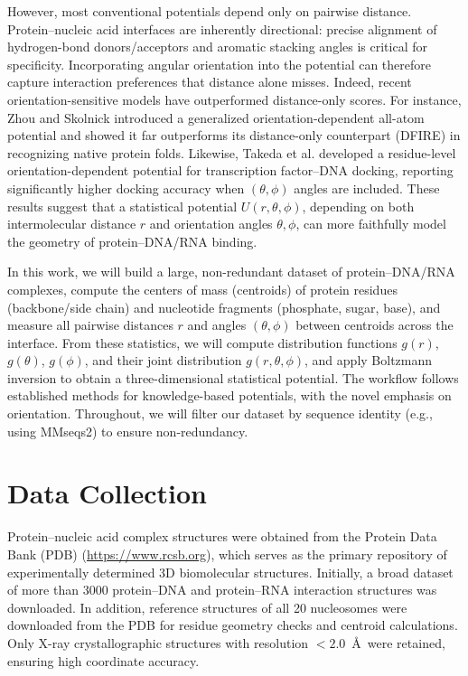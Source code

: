 \documentclass[12pt,a4paper]{report}
\begin{document}
However, most conventional potentials depend only on pairwise distance. Protein--nucleic acid interfaces are inherently directional: precise alignment of hydrogen-bond donors/acceptors and aromatic stacking angles is critical for specificity. Incorporating angular orientation into the potential can therefore capture interaction preferences that distance alone misses. Indeed, recent orientation-sensitive models have outperformed distance-only scores. For instance, Zhou and Skolnick \cite{Zhou2011} introduced a generalized orientation-dependent all-atom potential and showed it far outperforms its distance-only counterpart (DFIRE) in recognizing native protein folds. Likewise, Takeda et al. \cite{Takeda2013} developed a residue-level orientation-dependent potential for transcription factor--DNA docking, reporting significantly higher docking accuracy when $(\theta, \phi)$ angles are included. These results suggest that a statistical potential $U(r, \theta, \phi)$, depending on both intermolecular distance $r$ and orientation angles $\theta, \phi$, can more faithfully model the geometry of protein--DNA/RNA binding.

In this work, we will build a large, non-redundant dataset of protein--DNA/RNA complexes, compute the centers of mass (centroids) of protein residues (backbone/side chain) and nucleotide fragments (phosphate, sugar, base), and measure all pairwise distances $r$ and angles $(\theta, \phi)$ between centroids across the interface. From these statistics, we will compute distribution functions $g(r)$, $g(\theta)$, $g(\phi)$, and their joint distribution $g(r, \theta, \phi)$, and apply Boltzmann inversion to obtain a three-dimensional statistical potential. The workflow follows established methods for knowledge-based potentials, with the novel emphasis on orientation. Throughout, we will filter our dataset by sequence identity (e.g., using MMseqs2) to ensure non-redundancy.

\section*{Data Collection}

Protein--nucleic acid complex structures were obtained from the Protein Data Bank (PDB) (\url{https://www.rcsb.org}), which serves as the primary repository of experimentally determined 3D biomolecular structures. Initially, a broad dataset of more than 3000 protein--DNA and protein--RNA interaction structures was downloaded. In addition, reference structures of all 20 nucleosomes were downloaded from the PDB for residue geometry checks and centroid calculations. Only X-ray crystallographic structures with resolution $< 2.0$~\AA\ were retained, ensuring high coordinate accuracy.
\end{document}

